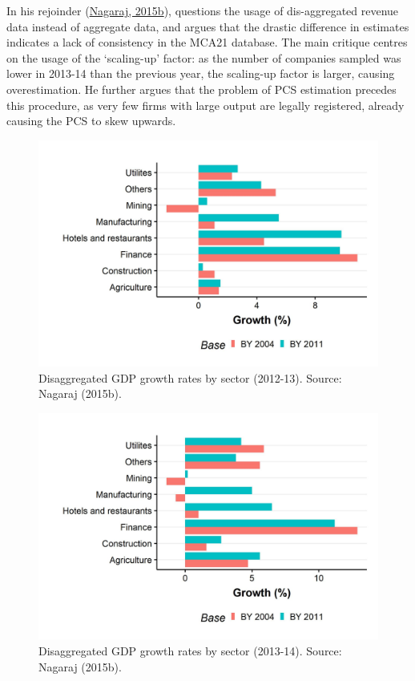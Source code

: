 \documentclass[12pt,nobind, a4paper]{reedthesis}
\begin{document}
 In his rejoinder (\protect\hyperlink{ref-nagaraj_seeds_2015}{Nagaraj, 2015b}), questions the usage of dis-aggregated revenue data instead of aggregate data, and argues that the drastic difference in estimates indicates a lack of consistency in the MCA21 database. The main critique centres on the usage of the `scaling-up' factor: as the number of companies sampled was lower in 2013-14 than the previous year, the scaling-up factor is larger, causing overestimation. He further argues that the problem of PCS estimation precedes this procedure, as very few firms with large output are legally registered, already causing the PCS to skew upwards.
 \begin{figure}

 {\centering \includegraphics[width=1\linewidth]{figure/nagaraj1} 

 }

 \caption{Disaggregated GDP growth rates by sector (2012-13). Source: Nagaraj (2015b).}\label{fig:nag1}
 \end{figure}
 \begin{figure}

 {\centering \includegraphics[width=1\linewidth]{figure/nagaraj2} 

 }

 \caption{Disaggregated GDP growth rates by sector (2013-14). Source: Nagaraj (2015b).}\label{fig:nag2}
 \end{figure}
\end{document}
